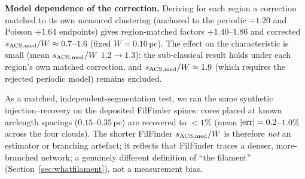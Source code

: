 \documentclass[usenatbib,twoside,twocolumn]{mnras}
\begin{document}
\smallskip\noindent\textbf{Model dependence of the correction.}\label{sec:injection_recovery_model}
Deriving for each region a correction matched to its own measured clustering (anchored to the periodic $\div1.20$ and Poisson $\div1.64$ endpoints) gives region-matched factors $\div1.40$--$1.86$ and corrected $s_{\rm ACS,med}/W\approx0.7$--$1.6$ (fixed $W=0.10$\,pc). The effect on the characteristic is small (mean $s_{\rm ACS,med}/W$ $1.2\to1.3$): the sub-classical result holds under each region's own matched correction, and $s_{\rm ACS,med}/W\approx1.9$ (which requires the rejected periodic model) remains excluded.

As a matched, independent-segmentation test, we ran the same synthetic injection--recovery on the deposited FilFinder spines: cores placed at known arclength spacings ($0.15$--$0.35$\,pc) are recovered to $<1\%$ (mean $|{\rm err}|=0.2$--$1.0\%$ across the four clouds). The shorter FilFinder $s_{\rm ACS,med}/W$ is therefore \emph{not} an estimator or branching artefact; it reflects that FilFinder traces a denser, more-branched network; a genuinely different definition of ``the filament'' (Section~\ref{sec:whatfilament}), not a measurement bias.
\end{document}
